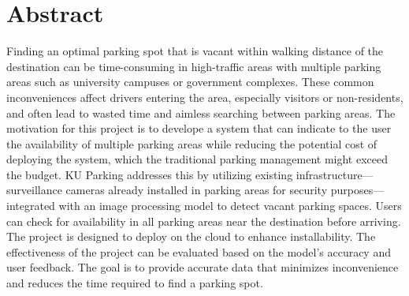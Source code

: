 \chapter*{Abstract}
\label{chap:abstract}

Finding an optimal parking spot that is vacant within walking distance of the destination can be time-consuming in high-traffic areas with multiple parking areas such as university campuses or government complexes.
These common inconveniences affect drivers entering the area, especially visitors or non-residents, and often lead to wasted time and aimless searching between parking areas. The motivation for this project is to develope a system that can indicate to the user the availability of multiple parking areas while reducing the potential cost of deploying the system, which the traditional parking management might exceed the budget. 
KU Parking addresses this by utilizing existing infrastructure—surveillance cameras already installed in parking areas for security purposes—integrated with an image processing model to detect vacant parking spaces.
Users can check for availability in all parking areas near the destination before arriving.
The project is designed to deploy on the cloud to enhance installability. 
The effectiveness of the project can be evaluated based on the model's accuracy and user feedback.
The goal is to provide accurate data that minimizes inconvenience and reduces the time required to find a parking spot.